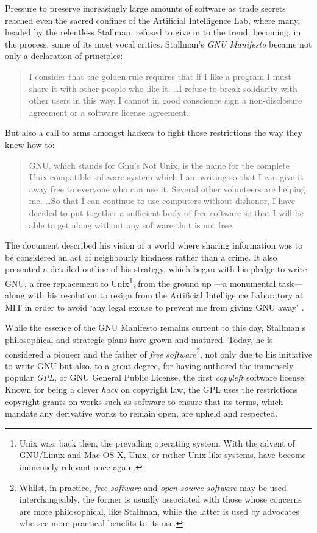 Pressure to preserve increasingly large amounts of software as trade secrets reached even the sacred confines of the Artificial Intelligence Lab, where many, headed by the relentless Stallman, refused to give in to the trend, becoming, in the process, some of its most vocal critics. Stallman's \citeyear{stallman85} \textit{GNU Manifesto} became not only a declaration of principles:

\begin{quote}
I consider that the golden rule requires that if I like a program I must share it with other people who like it. \dots I refuse to break solidarity with other users in this way. I cannot in good conscience sign a non-disclosure agreement or a software license agreement.
\end{quote}

\noindent
But also a call to arms amongst hackers to fight those restrictions the way they knew how to:

\begin{quote}
GNU, which stands for Gnu's Not Unix, is the name for the complete Unix-compatible software system which I am writing so that I can give it away free to everyone who can use it. Several other volunteers are helping me. \ldots So that I can continue to use computers without dishonor, I have decided to put together a sufficient body of free software so that I will be able to get along without any software that is not free.
\end{quote}

The document described his vision of a world where sharing information was to be considered an act of neighbourly kindness rather than a crime. It also presented a detailed outline of his strategy, which began with his pledge to write GNU, a free replacement to Unix\footnote{Unix was, back then, the prevailing operating system. With the advent of GNU/Linux and Mac OS X, Unix, or rather Unix-like systems, have become immensely relevant once again.}, from the ground up ---a monumental task--- along with his resolution to resign from the Artificial Intelligence Laboratory at MIT in order to avoid `any legal excuse to prevent me from giving GNU away' \citep{stallman85}.

While the essence of the GNU Manifesto remains current to this day, Stallman's philosophical and strategic plans have grown and matured. Today, he is considered a pioneer and the father of \textit{free software}\footnote{Whilst, in practice, \textit{free software} and \textit{open-source software} may be used interchangeably, the former is usually associated with those whose concerns are more philosophical, like Stallman, while the latter is used by advocates who see more practical benefits to its use.}, not only due to his initiative to write GNU but also, to a great degree, for having authored the immensely popular \textit{GPL}, or GNU General Public License, the first \textit{copyleft} software license. Known for being a clever \textit{hack} on copyright law, the GPL uses the restrictions copyright grants on works such as software to ensure that its terms, which mandate any derivative works to remain open, are upheld and respected.

